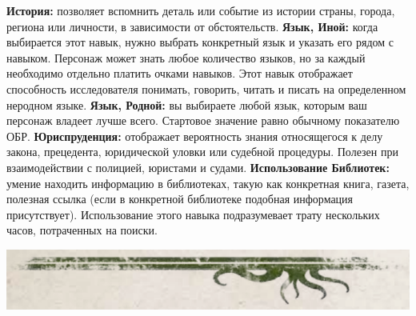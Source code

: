 \documentclass[letterpaper,twocolumn,openany, twoside, 11pt, usenames]{cocbook}
\begin{document}
\begin{fullcocpaperbox}{}{}
\begin{multicols}{3}
  \smallbreak
  \textbf{История:} позволяет вспомнить деталь или событие из истории страны, города, региона или личности, в зависимости от обстоятельств.
  \smallbreak
  \textbf{Язык, Иной:} когда выбирается этот навык, нужно выбрать конкретный язык и указать его рядом с навыком. Персонаж может знать любое количество языков, но за каждый необходимо отдельно платить очками навыков. Этот навык отображает способность исследователя понимать, говорить, читать и писать на определенном неродном языке.
  \smallbreak
  \textbf{Язык, Родной:} вы выбираете любой язык, которым ваш персонаж владеет лучше всего. Стартовое значение равно обычному показателю ОБР.
  \smallbreak
  \textbf{Юриспруденция:} отображает вероятность знания относящегося к делу закона, прецедента, юридической уловки или судебной процедуры. Полезен при взаимодействии с полицией, юристами и судами.
  \smallbreak
  \textbf{Использование Библиотек:} умение находить информацию в библиотеках, такую как конкретная книга, газета, полезная ссылка (если в конкретной библиотеке подобная информация присутствует). Использование этого навыка подразумевает трату нескольких часов, потраченных на поиски.
  \end{multicols}
  \includegraphics[width=\linewidth]{img/bottom.png}
\end{fullcocpaperbox}
\end{document}
